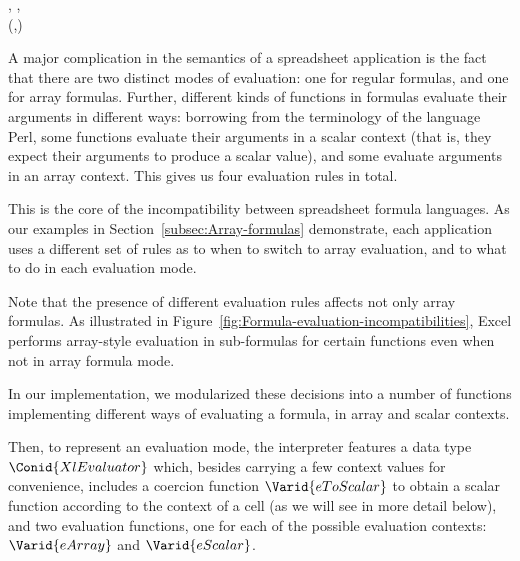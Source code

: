 \begin{hscode}\SaveRestoreHook
{}%
%
%
\>[B]{}\mathbin{::}{}\<[14]%
\>[14]{}\;\llparenthesis \cdot , \cdot \rrparenthesis \to {}\to {}\to \llparenthesis \cdot , \cdot \rrparenthesis \to {}\<[E]%
\\
\>[14]{}\to (,){}\<[E]%
\ColumnHook
\end{hscode}\resethooks

A major complication in the semantics of a spreadsheet application is the
fact that there are two distinct modes of evaluation: one for regular formulas,
and one for array formulas. Further, different kinds of functions in formulas
evaluate their arguments in different ways: borrowing from the terminology
of the language Perl, some functions evaluate their arguments in a scalar
context (that is, they expect their arguments to produce a scalar value),
and some evaluate arguments in an array context. This gives us four evaluation
rules in total.

This is the core of the incompatibility between spreadsheet formula languages.
As our examples in Section~\ref{subsec:Array-formulas} demonstrate, each
application uses a different set of rules as to when to switch to array
evaluation, and to what to do in each evaluation mode.

Note that the presence of different evaluation rules affects not only array
formulas. As illustrated in Figure~\ref{fig:Formula-evaluation-incompatibilities},
Excel performs array-style evaluation in sub-formulas for certain functions
even when not in array formula mode.

In our implementation, we modularized these decisions into a number of
functions implementing different ways of evaluating a formula, in array and
scalar contexts.

Then, to represent an evaluation mode, the interpreter features a data type
\ensuremath{\Conid{XlEvaluator}} which, besides carrying a few context values for convenience,
includes a coercion function \ensuremath{\Varid{eToScalar}} to obtain a scalar function according
to the context of a cell (as we will see in more detail below), and two
evaluation functions, one for each of the possible evaluation contexts:
\ensuremath{\Varid{eArray}} and \ensuremath{\Varid{eScalar}}.

